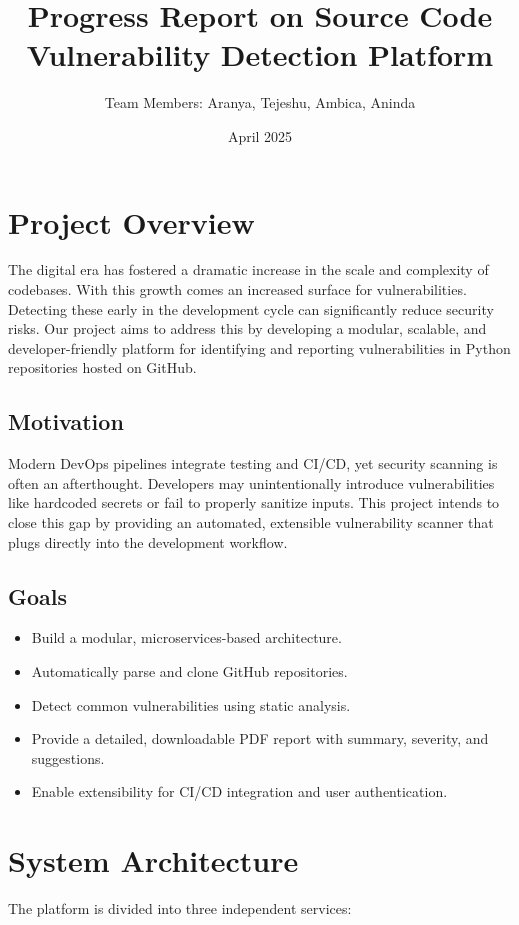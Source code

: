 \documentclass{article}
\title{\textbf{Progress Report on Source Code Vulnerability Detection Platform}}
\author{Team Members: Aranya, Tejeshu, Ambica, Aninda}
\date{April 2025}
\begin{document}
\maketitle

\tableofcontents
\newpage

\section{Project Overview}
The digital era has fostered a dramatic increase in the scale and complexity of codebases. With this growth comes an increased surface for vulnerabilities. Detecting these early in the development cycle can significantly reduce security risks. Our project aims to address this by developing a modular, scalable, and developer-friendly platform for identifying and reporting vulnerabilities in Python repositories hosted on GitHub.

\subsection{Motivation}
Modern DevOps pipelines integrate testing and CI/CD, yet security scanning is often an afterthought. Developers may unintentionally introduce vulnerabilities like hardcoded secrets or fail to properly sanitize inputs. This project intends to close this gap by providing an automated, extensible vulnerability scanner that plugs directly into the development workflow.

\subsection{Goals}
\begin{itemize}
    \item Build a modular, microservices-based architecture.
    \item Automatically parse and clone GitHub repositories.
    \item Detect common vulnerabilities using static analysis.
    \item Provide a detailed, downloadable PDF report with summary, severity, and suggestions.
    \item Enable extensibility for CI/CD integration and user authentication.
\end{itemize}

\section{System Architecture}
The platform is divided into three independent services:
\end{document}
